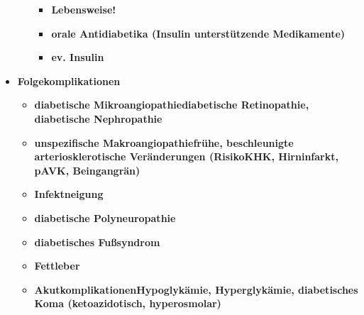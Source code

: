 \begin{itemize}
\begin{itemize}
					\begin{itemize}
						\item \textbf{Lebensweise!}
						\item \textbf{orale Antidiabetika (Insulin unterstützende Medikamente)}
						\item \textbf{ev. Insulin}
					\end{itemize}
			\end{itemize}
		\item \textbf{Folgekomplikationen}
			\begin{itemize}
				\item \textbf{diabetische Mikroangiopathiediabetische Retinopathie, diabetische Nephropathie}
				\item \textbf{unspezifische Makroangiopathiefrühe, beschleunigte arteriosklerotische Veränderungen (RisikoKHK, Hirninfarkt, pAVK, Beingangrän)}
				\item \textbf{Infektneigung}
				\item \textbf{diabetische Polyneuropathie}
				\item \textbf{diabetisches Fußsyndrom}
				\item \textbf{Fettleber}
				\item \textbf{AkutkomplikationenHypoglykämie, Hyperglykämie, diabetisches Koma (ketoazidotisch, hyperosmolar)}
			\end{itemize}
	\end{itemize}
